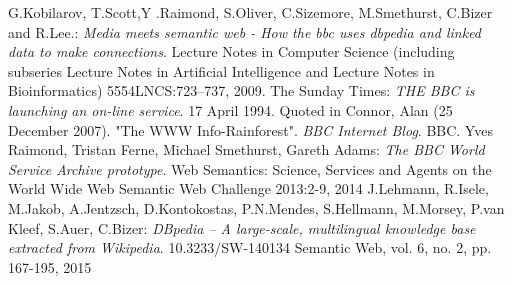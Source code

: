 \documentclass{llncs}
\begin{document}
%
%
%

%

%
%
\begin{thebibliography}{5}
%
  G.Kobilarov, T.Scott,Y .Raimond, S.Oliver, C.Sizemore, M.Smethurst, C.Bizer and R.Lee.:
  \textit{Media meets semantic web - How the bbc uses dbpedia and linked data to make connections}.
  Lecture Notes in Computer Science (including subseries Lecture Notes in Artiﬁcial Intelligence and Lecture Notes in Bioinformatics)
  5554LNCS:723–737, 2009.
%
  The Sunday Times:
  \textit{THE BBC is launching an on-line service}. 17 April 1994.
  Quoted in Connor, Alan (25 December 2007). "The WWW Info-Rainforest". \textit{BBC Internet Blog}. BBC.
%
  Yves Raimond, Tristan Ferne, Michael Smethurst, Gareth Adams:
  \textit{The BBC World Service Archive prototype}.
  Web Semantics: Science, Services and Agents on the World Wide Web
  Semantic Web Challenge 2013:2-9, 2014
%
  J.Lehmann, R.Isele, M.Jakob, A.Jentzsch, D.Kontokostas, P.N.Mendes, S.Hellmann, M.Morsey, P.van Kleef, S.Auer, C.Bizer:
  \textit{DBpedia – A large-scale, multilingual knowledge base extracted from Wikipedia}.
  10.3233/SW-140134
  Semantic Web, vol. 6, no. 2, pp. 167-195, 2015
%
\end{thebibliography}
\end{document}
